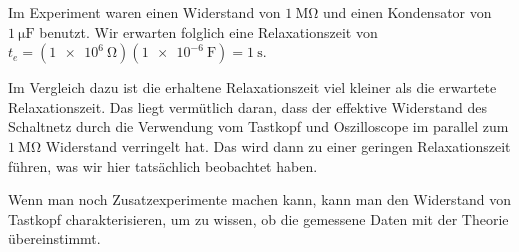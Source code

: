 	Im Experiment waren einen Widerstand von $\SI{1}{\mega\ohm}$ und einen Kondensator von $\SI{1}{\micro\farad}$ benutzt. Wir erwarten folglich eine Relaxationszeit von $t_e = (\SI{1e6}{\ohm})(\SI{1e-6}{\farad}) = \SI{1}{\second}$.

	Im Vergleich dazu ist die erhaltene Relaxationszeit viel kleiner als die erwartete Relaxationszeit. Das liegt vermütlich daran, dass der effektive Widerstand des Schaltnetz durch die Verwendung vom Tastkopf und Oszilloscope im parallel zum $\SI{1}{\mega\ohm}$ Widerstand verringelt hat. Das wird dann zu einer geringen Relaxationszeit führen, was wir hier tatsächlich beobachtet haben. 

	Wenn man noch Zusatzexperimente machen kann, kann man den Widerstand von Tastkopf charakterisieren, um zu wissen, ob die gemessene Daten mit der Theorie übereinstimmt. 